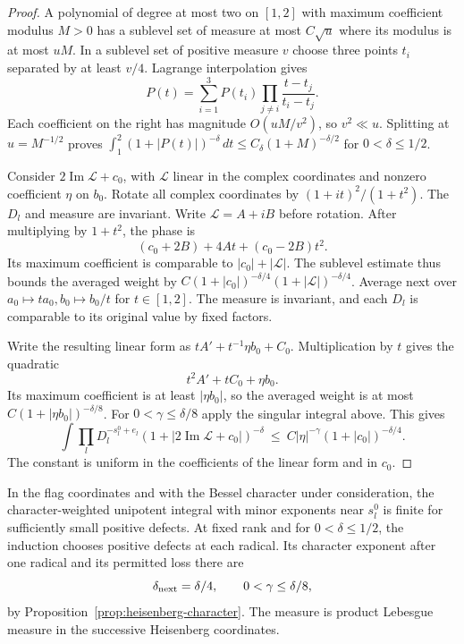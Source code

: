 \begin{proof}

A polynomial of degree at most two on \([1,2]\) with maximum
coefficient modulus \(M>0\) has a sublevel set of measure
at most \(C\sqrt u\) where its modulus is at most \(uM\).
In a sublevel set of positive measure \(v\) choose three
points \(t_i\) separated by at least \(v/4\). Lagrange interpolation gives
\[
 P(t)=\sum_{i=1}^3 P(t_i)\prod_{j\ne i}\frac{t-t_j}{t_i-t_j}.
\]
Each coefficient on the right has magnitude \(O(uM/v^2)\),
so \(v^2\ll u\). Splitting at \(u=M^{-1/2}\) proves
\(\int_1^2(1+|P(t)|)^{-\delta}\,dt\le
C_\delta(1+M)^{-\delta/2}\) for \(0<\delta\le1/2\).


Consider \(2\operatorname{Im}\mathcal L+c_0\), with
\(\mathcal L\) linear in the complex coordinates and nonzero
coefficient \(\eta\) on \(b_0\). Rotate all complex
coordinates by \((1+it)^2/(1+t^2)\).
The \(D_l\) and measure are invariant. Write \(\mathcal L=A+iB\) before rotation. After multiplying
by \(1+t^2\), the phase is
\[
     (c_0+2B)+4At+(c_0-2B)t^2 .
\]
Its maximum coefficient is comparable to \(|c_0|+|\mathcal L|\).
The sublevel estimate thus bounds the averaged weight
by \(C(1+|c_0|)^{-\delta/4}(1+|\mathcal L|)^{-\delta/4}\).
Average next over \(a_0\mapsto ta_0,b_0\mapsto b_0/t\)
for \(t\in[1,2]\). The measure is invariant, and each \(D_l\)
is comparable to its original value by fixed factors.

Write the resulting linear form as \(tA'+t^{-1}\eta b_0+C_0\).
Multiplication by \(t\) gives the quadratic
\[
          t^2 A'+t C_0+\eta b_0 .
\]
Its maximum coefficient is at least \(|\eta b_0|\), so the
averaged weight is at most \(C(1+|\eta b_0|)^{-\delta/8}\).
For \(0<\gamma\le\delta/8\) apply the singular integral
above. This gives
\[
 \int \prod_l D_l^{-s_l^0+e_l}
       (1+|2\operatorname{Im}\mathcal L+c_0|)^{-\delta}
 \ \le\ C|\eta|^{-\gamma}(1+|c_0|)^{-\delta/4}.
\]
The constant is uniform in the coefficients of the
linear form and in \(c_0\).

\end{proof}

\begin{proposition}\label{prop:xi-flag-unipotent}
In the flag coordinates and with the Bessel character under
consideration, the character-weighted unipotent integral with
minor exponents near \(s_l^0\) is finite for sufficiently small
positive defects. At fixed rank and for \(0<\delta\le1/2\), the induction chooses positive defects at each radical. Its character exponent after one radical and its permitted loss there are 
\[
 \delta_{\rm next}=\delta/4,\qquad 0<\gamma\le\delta/8,
\]
 by Proposition~\ref{prop:heisenberg-character}. The measure is product Lebesgue measure in the successive Heisenberg coordinates.
\end{proposition}

